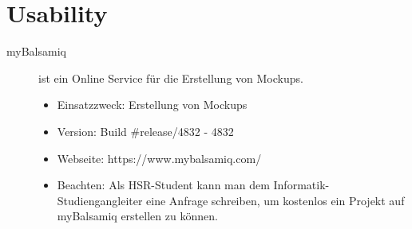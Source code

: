 \section{Usability}

\begin{description}
	\item [myBalsamiq] ist ein Online Service für die Erstellung von Mockups.
	\begin{itemize}
		\item Einsatzzweck: Erstellung von Mockups
		\item Version: Build \#release/4832 - 4832
		\item Webseite: https://www.mybalsamiq.com/
		\item Beachten: Als HSR-Student kann man dem Informatik-Studiengangleiter eine Anfrage schreiben, um kostenlos ein Projekt auf myBalsamiq erstellen zu können.
	\end{itemize}
\end{description}

